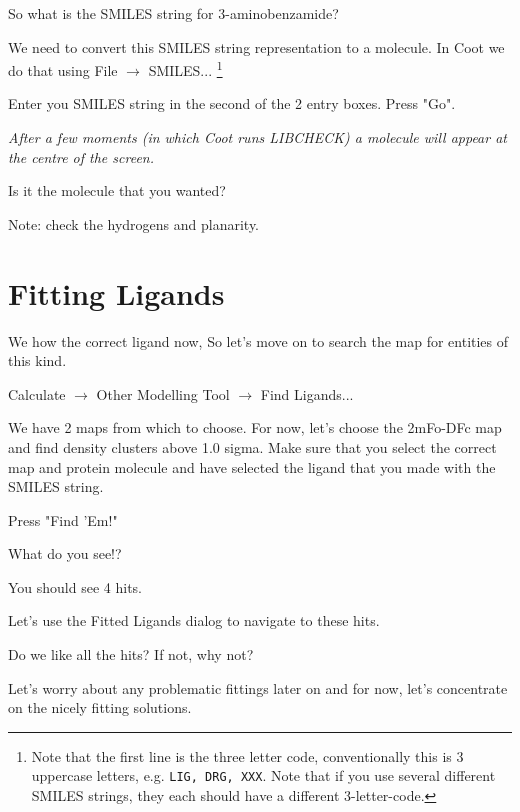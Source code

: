 \documentclass{article}
\begin{document}
 So what is the SMILES string for 3-aminobenzamide?


\textsf{ We need to convert this SMILES string representation to a
 molecule.  In Coot we do that using \textsf{File $\rightarrow$ SMILES...}
} \footnote{ Note that the first line is the three letter code, conventionally
 this is 3 uppercase letters, e.g. \texttt{LIG, DRG, XXX}.  Note that if you
 use several different SMILES strings, they each should have a
 different 3-letter-code.}

 Enter you SMILES string in the second of the 2 entry boxes. Press
 "Go".

 \textsl{ After a few moments (in which Coot runs LIBCHECK) a molecule
   will appear at the centre of the screen.}

 \begin{trivlist}
 \item Is it the molecule that you wanted?  

 \textsf{Note: check the hydrogens and planarity.}
 \end{trivlist}


\section{Fitting Ligands}

We how the correct ligand now, So let's move on to search the map for
entities of this kind.

 \textsf{Calculate $\rightarrow$ Other Modelling Tool $\rightarrow$ Find Ligands...}

 We have 2 maps from which to choose.  For now, let's choose the
 2mFo-DFc map and find density clusters above 1.0 sigma.  Make sure
 that you select the correct map and protein molecule and have
 selected the ligand that you made with the SMILES string.

 Press \textsf{"Find 'Em!"}

 \begin{trivlist}
 \item What do you see!? 

\textsf{You should see 4 hits.  }
 \end{trivlist}




Let's use the Fitted Ligands dialog to navigate to these hits.

\begin{trivlist}
\item Do we like all the hits?  If not, why not?  

\textsf{Let's worry about any problematic fittings later on and for
 now, let's concentrate on the nicely fitting solutions.}
\end{trivlist}
\end{document}
